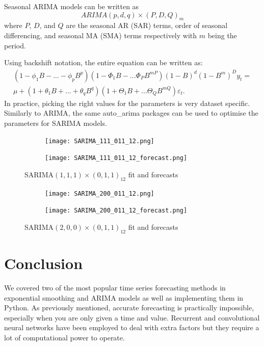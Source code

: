 \documentclass{article}
\begin{document}
  Seasonal ARIMA models can be written as 
  \begin{equation*}
    ARIMA(p,d,q)\times(P,D,Q)_m
  \end{equation*}
  where $P$, $D$, and $Q$ are the seasonal AR (SAR) terms, order of seasonal differencing, and seasonal MA (SMA) terms respectively with $m$ being the period.

  Using backshift notation, the entire equation can be written as:
  \begin{equation*}
    \begin{split}
      (1 - \phi_1B - ... - \phi_pB^p)(1 - \Phi_1B - ... \Phi_PB^{mP})(1 - B)^d(1 - B^m)^D y_t = \\
      \mu + (1 + \theta_1B + ... +\theta_qB^q)(1 + \Theta_1B + ... \Theta_QB^{mQ})\varepsilon_t.
    \end{split}
  \end{equation*}
  In practice, picking the right values for the parameters is very dataset specific. Similarly to ARIMA, the same auto\_arima packages can be used to optimise the parameters for SARIMA models.

  \begin{figure}[H]
    \centering
    \captionsetup{justification=centering}
    \begin{subfigure}[b]{0.49\linewidth}
      \texttt{[image: SARIMA\_111\_011\_12.png]}
    \end{subfigure}
    \begin{subfigure}[b]{0.49\linewidth}
      \texttt{[image: SARIMA\_111\_011\_12\_forecast.png]}
    \end{subfigure}
    \caption{SARIMA$(1,1,1)\times(0,1,1)_{12}$ fit and forecasts}
    \begin{subfigure}[b]{0.49\linewidth}
      \texttt{[image: SARIMA\_200\_011\_12.png]}
    \end{subfigure}
    \begin{subfigure}[b]{0.49\linewidth}
      \texttt{[image: SARIMA\_200\_011\_12\_forecast.png]}
    \end{subfigure}
    \caption{SARIMA$(2,0,0)\times(0,1,1)_{12}$ fit and forecasts}
  \end{figure}

  \section{Conclusion}
  We covered two of the most popular time series forecasting methods in exponential smoothing and ARIMA models as well as implementing them in Python. As previously mentioned, accurate forecasting is practically impossible, especially when you are only given a time and value. Recurrent and convolutional neural networks have been employed to deal with extra factors but they require a lot of computational power to operate.
\end{document}
